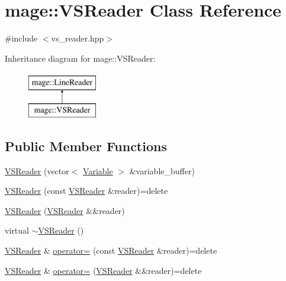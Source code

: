 \hypertarget{classmage_1_1_v_s_reader}{}\section{mage\+:\+:V\+S\+Reader Class Reference}
\label{classmage_1_1_v_s_reader}


{\ttfamily \#include $<$vs\+\_\+reader.\+hpp$>$}

Inheritance diagram for mage\+:\+:V\+S\+Reader\+:\begin{figure}[H]
\begin{center}
\leavevmode
\includegraphics[height=2.000000cm]{classmage_1_1_v_s_reader}
\end{center}
\end{figure}
\subsection*{Public Member Functions}
\begin{DoxyCompactItemize}
\item 
\hyperlink{classmage_1_1_v_s_reader_ab41fb08f6e7a72b0ba7059ecb8c91623}{V\+S\+Reader} (vector$<$ \hyperlink{structmage_1_1_variable}{Variable} $>$ \&variable\+\_\+buffer)
\item 
\hyperlink{classmage_1_1_v_s_reader_aec7ec2ea03d5d77c5e78438a60263a73}{V\+S\+Reader} (const \hyperlink{classmage_1_1_v_s_reader}{V\+S\+Reader} \&reader)=delete
\item 
\hyperlink{classmage_1_1_v_s_reader_aa7bb7d1792d4eef4734b4d4daa6e2ce7}{V\+S\+Reader} (\hyperlink{classmage_1_1_v_s_reader}{V\+S\+Reader} \&\&reader)
\item 
virtual \hyperlink{classmage_1_1_v_s_reader_ae3cb230b06f289adae239b785f1fabc6}{$\sim$\+V\+S\+Reader} ()
\item 
\hyperlink{classmage_1_1_v_s_reader}{V\+S\+Reader} \& \hyperlink{classmage_1_1_v_s_reader_ab7d85956947e6b2a28650498573bc055}{operator=} (const \hyperlink{classmage_1_1_v_s_reader}{V\+S\+Reader} \&reader)=delete
\item 
\hyperlink{classmage_1_1_v_s_reader}{V\+S\+Reader} \& \hyperlink{classmage_1_1_v_s_reader_a2be1e0645e3496f71c2f2b7fcf98ba2a}{operator=} (\hyperlink{classmage_1_1_v_s_reader}{V\+S\+Reader} \&\&reader)=delete
\end{DoxyCompactItemize}
